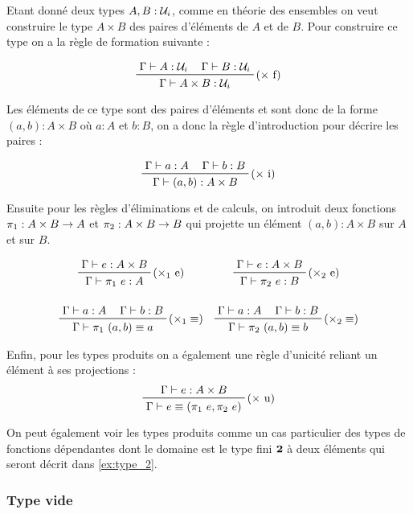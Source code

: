 \documentclass[../../rapport.tex]{subfiles}
\begin{document}
  Etant donné deux types $A, B : \mathcal U_i$, comme en théorie des ensembles on veut construire le type $A \times B$ des paires d'éléments
  de $A$ et de $B$. Pour construire ce type on a la règle de formation suivante :

  $$
  \prfinterspace=1.2em
  \prftree[r]{($\times$ f)}
  {\Gamma \vdash A : \U_i}
  {\Gamma \vdash B : \U_i}
  {\Gamma \vdash A \times B : \U_i}
  $$

  Les éléments de ce type sont des paires d'éléments et sont donc de la forme $(a, b) : A \times B$ où $a : A$ et $b : B$,
  on a donc la règle d'introduction pour décrire les paires :

  $$
  \prfinterspace=1.2em
  \prftree[r]{($\times$ i)}
  {\Gamma \vdash a : A}
  {\Gamma \vdash b : B}
  {\Gamma \vdash (a, b) : A \times B}
  $$

  Ensuite pour les règles d'éliminations et de calculs,
  on introduit deux fonctions $\pi_1 : A \times B \rightarrow A$ et $\pi_2 : A \times B \rightarrow B$
  qui projette un élément $(a, b) : A \times B$ sur $A$ et sur $B$.

  $$
  \prfinterspace=1.2em
  \begin{array}{cc}
    \prftree[r]{($\times_1$ e)}
    {\Gamma \vdash e : A \times B}
    {\Gamma \vdash \pi_1\ e : A}
    &
    \prftree[r]{($\times_2$ e)}
    {\Gamma \vdash e : A \times B}
    {\Gamma \vdash \pi_2\ e : B}
    \vspace{1.5em}\\
    \prftree[r]{($\times_1 \equiv$)}
    {\Gamma \vdash a : A}
    {\Gamma \vdash b : B}
    {\Gamma \vdash \pi_1\ (a, b) \equiv a}
    &
    \prftree[r]{($\times_2 \equiv$)}
    {\Gamma \vdash a : A}
    {\Gamma \vdash b : B}
    {\Gamma \vdash \pi_2\ (a, b) \equiv b}
  \end{array}
  $$

  Enfin, pour les types produits on a également une règle d'unicité reliant un élément à ses projections :
  $$
  \prftree[r]{($\times$ u)}
  {\Gamma \vdash e : A \times B}
  {\Gamma \vdash e \equiv (\pi_1\ e, \pi_2\ e)}
  $$

  On peut également voir les types produits comme un cas particulier des types de fonctions dépendantes dont le domaine
  est le type fini $\operatorname{\textbf{2}}$ à deux éléments qui seront décrit dans \ref{ex:type_2}.

  \subsubsection{Type vide}
\end{document}

